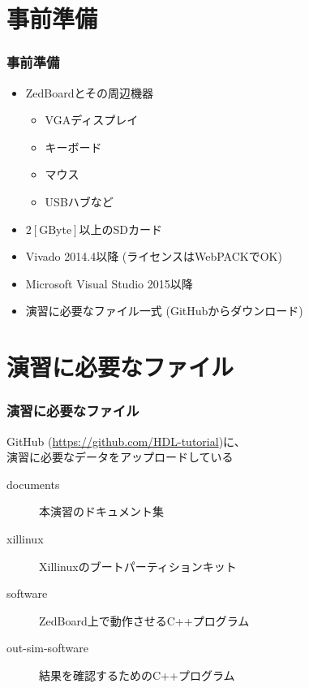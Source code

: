 ﻿\documentclass[dvipdfmx]{beamer}
\begin{document}
\section{事前準備}
\begin{frame}
	\frametitle{事前準備}
	\begin{itemize}
		\item
			ZedBoardとその周辺機器
			\begin{itemize}
				\item
					VGAディスプレイ
				\item
					キーボード
				\item
					マウス
				\item
					USBハブなど
			\end{itemize}
			\vfill
		\item
			$2\mathrm{[GByte]}$以上のSDカード
			\vfill
		\item
			Vivado 2014.4以降 (ライセンスはWebPACKでOK)
			\vfill
		\item
			Microsoft Visual Studio 2015以降
			\vfill
		\item
			演習に必要なファイル一式 (GitHubからダウンロード)
			\vfill
	\end{itemize}
\end{frame}

\section{演習に必要なファイル}
\begin{frame}
	\frametitle{演習に必要なファイル}
	
	GitHub (\url{https://github.com/HDL-tutorial})に、\\
	演習に必要なデータをアップロードしている
	\vfill
	\begin{description}
		\item[documents]\mbox{}
			本演習のドキュメント集
			\vfill
		\item[xillinux]\mbox{}
			Xillinuxのブートパーティションキット
			\vfill
		\item[software]\mbox{}
			ZedBoard上で動作させるC++プログラム
			\vfill
		\item[out-sim-software]\mbox{}
			結果を確認するためのC++プログラム
			\vfill
	\end{description}
\end{frame}
\end{document}

